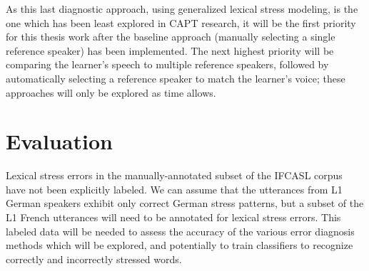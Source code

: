 As this last diagnostic approach, using generalized lexical stress modeling, is the one which has been least explored in CAPT research, it will be the first priority for this thesis work after the baseline approach (manually selecting a single reference speaker) has been implemented. The next highest priority will be comparing the learner's speech to multiple reference speakers, followed by automatically selecting a reference speaker to match the learner's voice; these approaches will only be explored as time allows.

\section{Evaluation}
\label{sec:diag:eval}

Lexical stress errors in the manually-annotated subset of the IFCASL corpus have not been explicitly labeled. We can assume that the utterances from L1 German speakers exhibit only correct German stress patterns, but a subset of the L1 French utterances will need to be annotated for lexical stress errors. This labeled data will be needed to assess the accuracy of the various error diagnosis methods which will be explored, and potentially to train classifiers to recognize correctly and incorrectly stressed words. 

